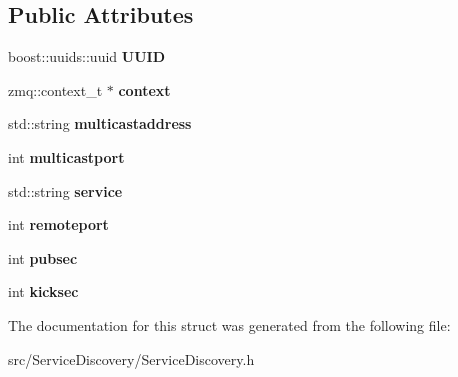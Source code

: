 \subsection*{Public Attributes}
\begin{DoxyCompactItemize}
\item 
\hypertarget{structthread__args_a707586ba05cc2c8be29cf22769b67634}{boost\-::uuids\-::uuid {\bfseries U\-U\-I\-D}}\label{structthread__args_a707586ba05cc2c8be29cf22769b67634}

\item 
\hypertarget{structthread__args_a217d01ac4eb4fd9c9ed1ebe4d02ca330}{zmq\-::context\-\_\-t $\ast$ {\bfseries context}}\label{structthread__args_a217d01ac4eb4fd9c9ed1ebe4d02ca330}

\item 
\hypertarget{structthread__args_a15f6bcc7a120e51d1074bb8703322ed5}{std\-::string {\bfseries multicastaddress}}\label{structthread__args_a15f6bcc7a120e51d1074bb8703322ed5}

\item 
\hypertarget{structthread__args_aa6059ab0eeca3f487491f2542bb5120b}{int {\bfseries multicastport}}\label{structthread__args_aa6059ab0eeca3f487491f2542bb5120b}

\item 
\hypertarget{structthread__args_a92798a7f2094db41f45ecbef0c067ca9}{std\-::string {\bfseries service}}\label{structthread__args_a92798a7f2094db41f45ecbef0c067ca9}

\item 
\hypertarget{structthread__args_a371407c82f7f64e3d9df634e59369565}{int {\bfseries remoteport}}\label{structthread__args_a371407c82f7f64e3d9df634e59369565}

\item 
\hypertarget{structthread__args_aba650f345201e8aece9071377945cf0e}{int {\bfseries pubsec}}\label{structthread__args_aba650f345201e8aece9071377945cf0e}

\item 
\hypertarget{structthread__args_a9b75103528b3a6fcc3dfc133cd1b1e8e}{int {\bfseries kicksec}}\label{structthread__args_a9b75103528b3a6fcc3dfc133cd1b1e8e}

\end{DoxyCompactItemize}


The documentation for this struct was generated from the following file\-:\begin{DoxyCompactItemize}
\item 
src/\-Service\-Discovery/Service\-Discovery.\-h\end{DoxyCompactItemize}
